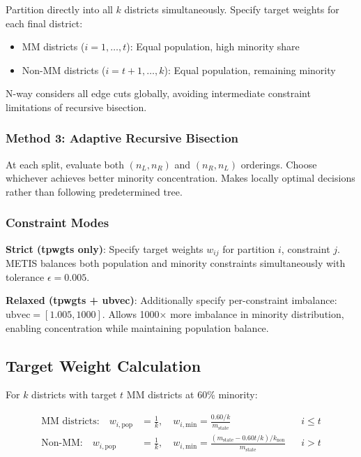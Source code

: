 Partition directly into all $k$ districts simultaneously. Specify target weights for each final district:
\begin{itemize}
\item MM districts ($i = 1, \ldots, t$): Equal population, high minority share
\item Non-MM districts ($i = t+1, \ldots, k$): Equal population, remaining minority
\end{itemize}

N-way considers all edge cuts globally, avoiding intermediate constraint limitations of recursive bisection.

\subsubsection{Method 3: Adaptive Recursive Bisection}

At each split, evaluate both $(n_L, n_R)$ and $(n_R, n_L)$ orderings. Choose whichever achieves better minority concentration. Makes locally optimal decisions rather than following predetermined tree.

\subsubsection{Constraint Modes}

\textbf{Strict (tpwgts only)}: Specify target weights $w_{ij}$ for partition $i$, constraint $j$. METIS balances both population and minority constraints simultaneously with tolerance $\epsilon = 0.005$.

\textbf{Relaxed (tpwgts + ubvec)}: Additionally specify per-constraint imbalance: $\text{ubvec} = [1.005, 1000]$. Allows 1000$\times$ more imbalance in minority distribution, enabling concentration while maintaining population balance.

\subsection{Target Weight Calculation}

For $k$ districts with target $t$ MM districts at 60\% minority:

\begin{align}
\text{MM districts:} \quad w_{i,\text{pop}} &= \frac{1}{k}, \quad w_{i,\text{min}} = \frac{0.60/k}{m_{\text{state}}} && i \leq t\\
\text{Non-MM:} \quad w_{i,\text{pop}} &= \frac{1}{k}, \quad w_{i,\text{min}} = \frac{(m_{\text{state}} - 0.60t/k)/k_{\text{non}}}{m_{\text{state}}} && i > t
\end{align}

